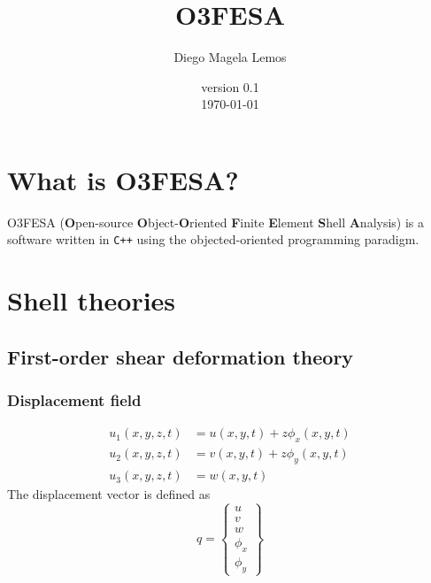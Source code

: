 \documentclass[12pt]{article}
\title{O3FESA}
\author{Diego Magela Lemos}
\date{version 0.1 \\ \today}
\numberwithin{equation}{section}
\begin{document}
\maketitle

\section{What is O3FESA?}

O3FESA (\textbf{O}pen-source \textbf{O}bject-\textbf{O}riented \textbf{F}inite \textbf{E}lement \textbf{S}hell \textbf{A}nalysis) is a software written in \texttt{C++} using the objected-oriented programming paradigm.

\section{Shell theories}

\subsection{First-order shear deformation theory}

\subsubsection{Displacement field}

\begin{subequations}
    \begin{align}
        u_1(x, y, z, t) & = u(x, y, t) + z \phi_x(x, y, t) \\
        u_2(x, y, z, t) & = v(x, y, t) + z \phi_y(x, y, t) \\
        u_3(x, y, z, t) & = w(x, y, t)
    \end{align}
    \label{eq:displacement_field}
\end{subequations}
%
The displacement vector is defined as
%
\begin{equation}
    q =
    \begin{Bmatrix}
        u      \\
        v      \\
        w      \\
        \phi_x \\
        \phi_y
    \end{Bmatrix}
    \label{eq:displacement_vector}
\end{equation}
% 
\end{document}
